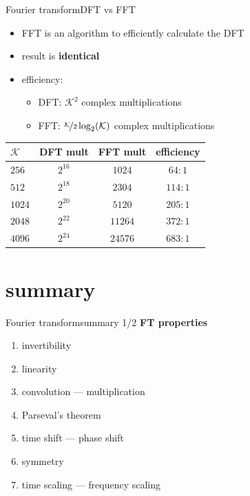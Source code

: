 	\begin{frame}{Fourier transform}{DFT vs FFT}
        \begin{itemize}
            \item   FFT is an algorithm to efficiently calculate the DFT
            \item   result is \textbf{identical}
            \item   efficiency:
                \begin{itemize}
                    \item   DFT: $\mathcal{K}^2$ complex multiplications
                    \item   FFT: $\nicefrac{\mathcal{K}}{2}\log_2(\mathcal{K})$ complex multiplications
                \end{itemize}
        \end{itemize}
        
        \begin{table}
            \centering
                \begin{tabular}{l|ccc}
                    $\mathcal{K}$  & DFT mult & FFT mult & efficiency\\ \hline
                    
                    $256$ & $2^{16}$ & $1024$ & $64:1$\\
                    $512$ & $2^{18}$ & $2304$ & $114:1$\\
                    $1024$ & $2^{20}$ & $5120$ & $205:1$\\
                    $2048$ & $2^{22}$ & $11264$ & $372:1$\\
                    $4096$ & $2^{24}$ & $24576$ & $683:1$\\
                \end{tabular}
        \end{table}
	\end{frame}	
    
    \section[summary]{summary}
            \begin{frame}{Fourier transform}{summary 1/2}
                \textbf{FT properties}
                \begin{enumerate}
                    \item   invertibility
                    \item   linearity
                    \item   convolution --- multiplication
                    \item   Parseval's theorem
                    \item   time shift --- phase shift
                    \item   symmetry
                    \item   time scaling --- frequency scaling
                \end{enumerate}
            \end{frame}	
    
